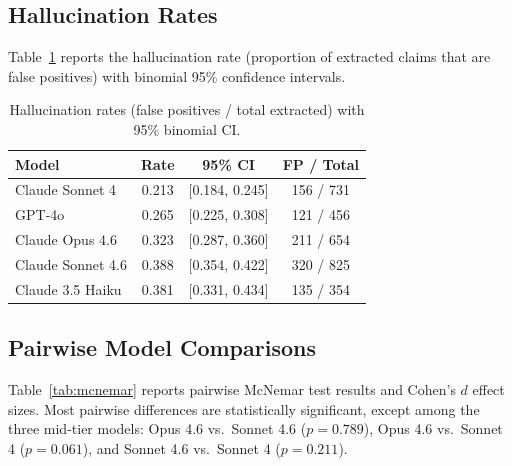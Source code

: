 \documentclass[11pt,a4paper]{article}
\begin{document}
\subsection{Hallucination Rates}

Table~\ref{tab:hallucination} reports the hallucination rate (proportion of
extracted claims that are false positives) with binomial 95\% confidence
intervals.

\begin{table}[ht]
\centering
\caption{Hallucination rates (false positives / total extracted) with 95\%
  binomial CI.}
\label{tab:hallucination}
\begin{tabular}{lccc}
\toprule
\textbf{Model} & \textbf{Rate} & \textbf{95\% CI} & \textbf{FP / Total} \\
\midrule
Claude Sonnet 4   & 0.213 & [0.184, 0.245] & 156 / 731 \\
GPT-4o            & 0.265 & [0.225, 0.308] & 121 / 456 \\
Claude Opus 4.6   & 0.323 & [0.287, 0.360] & 211 / 654 \\
Claude Sonnet 4.6 & 0.388 & [0.354, 0.422] & 320 / 825 \\
Claude 3.5 Haiku  & 0.381 & [0.331, 0.434] & 135 / 354 \\
\bottomrule
\end{tabular}
\end{table}

\subsection{Pairwise Model Comparisons}

Table~\ref{tab:mcnemar} reports pairwise McNemar test results and Cohen's
$d$ effect sizes.  Most pairwise differences are statistically significant,
except among the three mid-tier models: Opus 4.6 vs.\ Sonnet 4.6
($p = 0.789$), Opus 4.6 vs.\ Sonnet 4 ($p = 0.061$), and Sonnet 4.6 vs.\
Sonnet 4 ($p = 0.211$).
\end{document}
